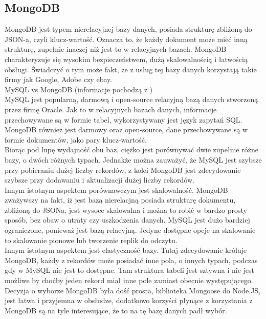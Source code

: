 \documentclass[12pt]{article}
\begin{document}
\begin{sloppypar}
{  \subsection{MongoDB}
  {
    MongoDB jest typem nierelacyjnej bazy danych, posiada strukturę zbliżoną do JSON-a, czyli klucz-wartość. Oznacza to, że każdy dokument może mieć inną strukturę, 
    zupełnie inaczej niż jest to w relacyjnych bazach. MongoDB charakteryzuje się wysokim bezpieczeństwem, dużą skalowalnością i łatwością obsługi. 
    Świadczyć o tym może fakt, że z usług tej bazy danych korzystają takie firmy jak Google, Adobe czy ebay. \\
    MySQL vs MongoDB (informacje pochodzą z \cite{mongovsmysql})\\
    MySQL jest popularną, darmową i open-source relacyjną bazą danych stworzoną przez firmę Oracle. Jak to w relacyjnych bazach danych, informacje przechowywane są w formie tabel, 
    wykorzystywany jest język zapytań SQL.\\
    MongoDB również jest darmowy oraz open-source, dane przechowywane są w formie dokumentów, jako pary klucz-wartość.\\
    Biorąc pod lupę wydajność obu baz, ciężko jest porównywać dwie zupełnie różne bazy, o dwóch różnych typach. Jednakże można zauważyć, że MySQL jest szybsze przy pobieraniu dużej liczby rekordów,
    z kolei MongoDB jest zdecydowanie szybsze przy dodawaniu i aktualizacji dużej liczby rekordów.\\
    Innym istotnym aspektem porównawczym jest skalowalność. MongoDB zważywszy na fakt, iż jest bazą nierelacjną posiada strukturę dokumentu, zbliżoną do JSONa, jest wysoce skalowalna i 
    można to robić w bardzo prosty sposób, bez obaw o utraty czy uszkodzenia danych. MySQL jest dużo bardziej ograniczone, ponieważ jest bazą relacyjną. 
    Jedyne dostępne opcje na skalowanie to skalowanie pionowe lub tworzenie replik do odczytu.\\
    Innym istotnym aspektem jest elastyczność bazy. Tutaj zdecydowanie króluje MongoDB, każdy z rekordów może posiadać inne pola, o innych typach, podczas gdy w MySQL 
    nie jest to dostępne. Tam struktura tabeli jest sztywna i nie jest możliwe by choćby jeden rekord miał inne pole zamiast obecnie występującego. \\
    Decyzja o wyborze MongoDB była dość prosta, biblioteka Mongoose do Node.JS, jest łatwa i przyjemna w obsłudze, dodatkowo korzyści płynące z korzystania z MongoDB są na tyle 
    interesujące, że to na tę bazę danych padł wybór.
  }
}
\end{sloppypar}
\end{document}
